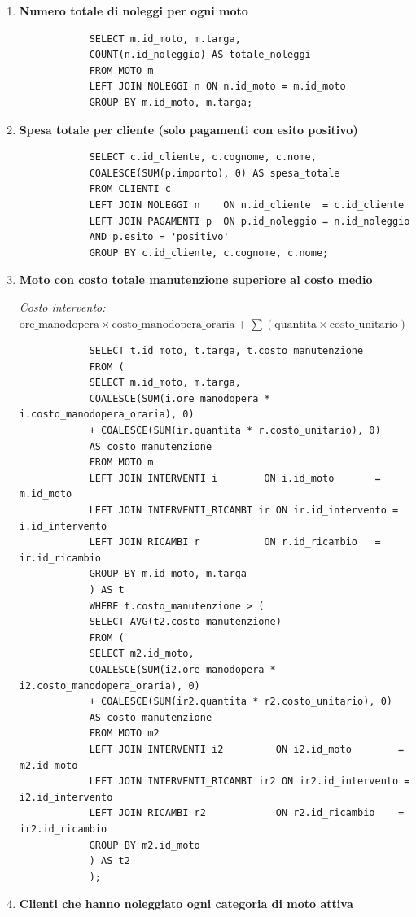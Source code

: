 \documentclass[a4paper,12pt]{article}
\begin{document}
\begin{enumerate}
		\item \textbf{Numero totale di noleggi per ogni moto}
		\begin{lstlisting}
			SELECT m.id_moto, m.targa,
			COUNT(n.id_noleggio) AS totale_noleggi
			FROM MOTO m
			LEFT JOIN NOLEGGI n ON n.id_moto = m.id_moto
			GROUP BY m.id_moto, m.targa;
		\end{lstlisting}
		
		\item \textbf{Spesa totale per cliente (solo pagamenti con esito positivo)}
		\begin{lstlisting}
			SELECT c.id_cliente, c.cognome, c.nome,
			COALESCE(SUM(p.importo), 0) AS spesa_totale
			FROM CLIENTI c
			LEFT JOIN NOLEGGI n    ON n.id_cliente  = c.id_cliente
			LEFT JOIN PAGAMENTI p  ON p.id_noleggio = n.id_noleggio
			AND p.esito = 'positivo'
			GROUP BY c.id_cliente, c.cognome, c.nome;
		\end{lstlisting}
		
		\item \textbf{Moto con costo totale manutenzione superiore al costo medio}
		
		\textit{Costo intervento:}
		$\text{ore\_manodopera} \times \text{costo\_manodopera\_oraria}
		+ \sum(\text{quantita} \times \text{costo\_unitario})$
		
		\begin{lstlisting}
			SELECT t.id_moto, t.targa, t.costo_manutenzione
			FROM (
			SELECT m.id_moto, m.targa,
			COALESCE(SUM(i.ore_manodopera * i.costo_manodopera_oraria), 0)
			+ COALESCE(SUM(ir.quantita * r.costo_unitario), 0)
			AS costo_manutenzione
			FROM MOTO m
			LEFT JOIN INTERVENTI i        ON i.id_moto       = m.id_moto
			LEFT JOIN INTERVENTI_RICAMBI ir ON ir.id_intervento = i.id_intervento
			LEFT JOIN RICAMBI r           ON r.id_ricambio   = ir.id_ricambio
			GROUP BY m.id_moto, m.targa
			) AS t
			WHERE t.costo_manutenzione > (
			SELECT AVG(t2.costo_manutenzione)
			FROM (
			SELECT m2.id_moto,
			COALESCE(SUM(i2.ore_manodopera * i2.costo_manodopera_oraria), 0)
			+ COALESCE(SUM(ir2.quantita * r2.costo_unitario), 0)
			AS costo_manutenzione
			FROM MOTO m2
			LEFT JOIN INTERVENTI i2         ON i2.id_moto        = m2.id_moto
			LEFT JOIN INTERVENTI_RICAMBI ir2 ON ir2.id_intervento = i2.id_intervento
			LEFT JOIN RICAMBI r2            ON r2.id_ricambio    = ir2.id_ricambio
			GROUP BY m2.id_moto
			) AS t2
			);
		\end{lstlisting}
		
		\item \textbf{Clienti che hanno noleggiato ogni categoria di moto attiva}
		

\end{enumerate}
\end{document}
